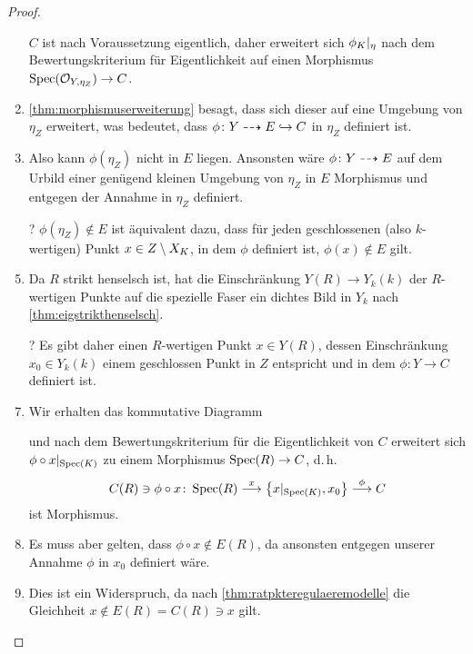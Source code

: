 \documentclass[german]{scrreprt}
\begin{document}
\begin{Lemma}
\begin{proof}
\begin{enumerate}
      $C$ ist nach Voraussetzung eigentlich, daher erweitert sich
      $\phi_{K}|_{\eta}$ nach dem Bewertungskriterium für
      Eigentlichkeit auf einen Morphismus
      $\operatorname{Spec}(\mathcal{O}_{Y,\eta_Z})\to C$.
    \item \autoref{thm:morphismuserweiterung} besagt, dass sich
      dieser auf eine Umgebung von $\eta_Z$ erweitert, was bedeutet,
      dass $\phi\colon Y\dashrightarrow E\hookrightarrow C$ in $\eta_Z$ definiert
      ist.
    \item Also kann $\phi(\eta_Z)$ nicht in $E$ liegen. Ansonsten
      wäre $\phi\colon Y\dashrightarrow E$ auf dem Urbild einer genügend kleinen
      Umgebung von $\eta_Z$ in $E$ Morphismus und entgegen der Annahme in
      $\eta_Z$ definiert.
    \item[?] $\phi(\eta_Z)\not\in E$ ist äquivalent dazu, dass für
      jeden geschlossenen (also $k$-wertigen) Punkt $x\in Z\setminus
      X_{K}$, in dem $\phi$ definiert ist, $\phi(x)\not\in E$ gilt.
    \item Da $R$ strikt henselsch ist, hat die Einschränkung $Y(R)\to
      Y_k(k)$ der $R$-wertigen Punkte auf die spezielle Faser ein
      dichtes Bild in $Y_k$ nach \autoref{thm:eigstrikthenselsch}.
    \item[?] Es gibt daher einen $R$-wertigen Punkt $x\in Y(R)$,
      dessen Einschränkung $x_0\in Y_k(k)$ einem geschlossen Punkt in
      $Z$ entspricht und in dem $\phi\colon Y\to C$ definiert ist.
    \item Wir erhalten das kommutative Diagramm
      \begin{center}
      \end{center}
      und nach dem Bewertungskriterium für die Eigentlichkeit von $C$
      erweitert sich $\phi\circ x|_{\operatorname{Spec}(K)}$ zu einem Morphismus
      $\operatorname{Spec}(R)\to C$, d.\,h.
      \begin{gather*}
        C(R)\ni\phi\circ x\colon
        \operatorname{Spec}(R)
        \overset{x}{\longrightarrow}
        \left\{ x|_{\operatorname{Spec}(K)}, x_0 \right\}
        \overset{\phi}{\longrightarrow} C
      \end{gather*}
      ist Morphismus.
    \item Es muss aber gelten, dass $\phi\circ x\not\in E(R)$, da
      ansonsten entgegen unserer Annahme $\phi$ in $x_0$ definiert
      wäre.
    \item Dies ist ein Widerspruch, da nach
      \autoref{thm:ratpkteregulaeremodelle} die Gleichheit
      $x\not\in E(R)=C(R)\ni x$ gilt.
    \end{enumerate}
  \end{proof}
\end{Lemma}
\end{document}
